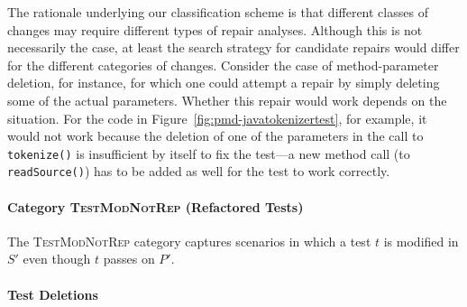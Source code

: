 \documentclass[conference]{IEEEtran}
\newcommand{\lang}[1]{\texttt{\small #1}}
\newcommand{\subject}[1]{\texttt{\small #1}}
\newcommand{\catref}{\textsc{TestModNotRep}}
\begin{document}
The rationale underlying our classification scheme is that different
classes of changes may require different types of repair analyses.
Although this is not necessarily the case, at least the search
strategy for candidate repairs would differ for the different
categories of changes. Consider the case of method-parameter deletion,
for instance, for which one could attempt a repair by simply deleting
some of the actual parameters. Whether this repair would work depends
on the situation. For the code in
Figure~\ref{fig:pmd-javatokenizertest}, for example, it would not work
because the deletion of one of the parameters in the call to
\lang{tokenize()} is insufficient by itself to fix the test---a new
method call (to \lang{readSource()}) has to be added as well for the
test to work correctly.

\paragraph{Category \catref{} (Refactored Tests)}
\label{sec:category-c2}

The \catref{} category captures scenarios in which a test $t$ is
modified in $S'$ even though $t$ passes on $P'$.



\paragraph*{\textbf{Test Deletions}}
\label{sec:test-ref}
\end{document}
